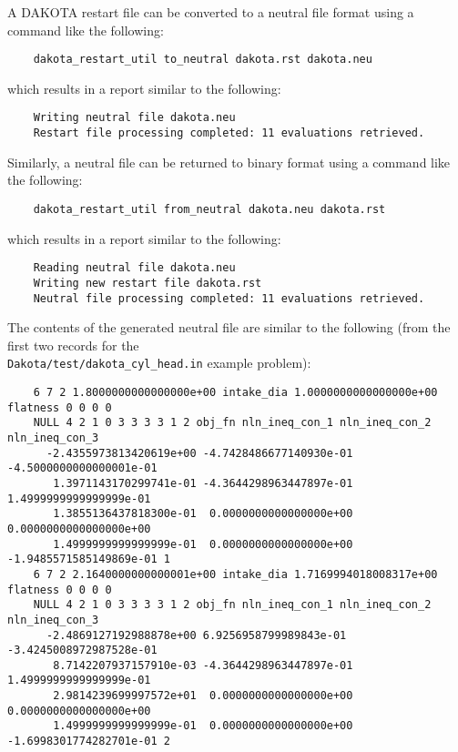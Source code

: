 A DAKOTA restart file can be converted to a neutral file format using
a command like the following:
\begin{small}
\begin{verbatim}
    dakota_restart_util to_neutral dakota.rst dakota.neu
\end{verbatim}
\end{small}
which results in a report similar to the following:
\begin{small}
\begin{verbatim}
    Writing neutral file dakota.neu
    Restart file processing completed: 11 evaluations retrieved.
\end{verbatim}
\end{small}

Similarly, a neutral file can be returned to binary format using a
command like the following:
\begin{small}
\begin{verbatim}
    dakota_restart_util from_neutral dakota.neu dakota.rst
\end{verbatim}
\end{small}
which results in a report similar to the following:
\begin{small}
\begin{verbatim}
    Reading neutral file dakota.neu
    Writing new restart file dakota.rst
    Neutral file processing completed: 11 evaluations retrieved.
\end{verbatim}
\end{small}

The contents of the generated neutral file are similar to the 
following (from the first two records for the\\
\texttt{Dakota/test/dakota\_cyl\_head.in} example problem):
\begin{small}
\begin{verbatim}
    6 7 2 1.8000000000000000e+00 intake_dia 1.0000000000000000e+00 flatness 0 0 0 0
    NULL 4 2 1 0 3 3 3 3 1 2 obj_fn nln_ineq_con_1 nln_ineq_con_2 nln_ineq_con_3
      -2.4355973813420619e+00 -4.7428486677140930e-01 -4.5000000000000001e-01
       1.3971143170299741e-01 -4.3644298963447897e-01  1.4999999999999999e-01
       1.3855136437818300e-01  0.0000000000000000e+00  0.0000000000000000e+00
       1.4999999999999999e-01  0.0000000000000000e+00 -1.9485571585149869e-01 1
    6 7 2 2.1640000000000001e+00 intake_dia 1.7169994018008317e+00 flatness 0 0 0 0
    NULL 4 2 1 0 3 3 3 3 1 2 obj_fn nln_ineq_con_1 nln_ineq_con_2 nln_ineq_con_3
      -2.4869127192988878e+00 6.9256958799989843e-01 -3.4245008972987528e-01
       8.7142207937157910e-03 -4.3644298963447897e-01  1.4999999999999999e-01
       2.9814239699997572e+01  0.0000000000000000e+00  0.0000000000000000e+00
       1.4999999999999999e-01  0.0000000000000000e+00 -1.6998301774282701e-01 2
\end{verbatim}
\end{small}

